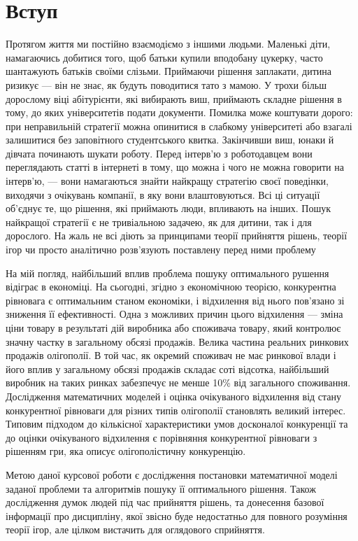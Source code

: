 \documentclass[a4paper]{article}
\begin{document}
\section{Вступ}
Протягом життя ми постійно взаємодіємо з іншими людьми. Маленькі діти, намагаючись добитися того, щоб батьки купили вподобану цукерку, часто шантажують батьків своїми слізьми. Приймаючи рішення заплакати, дитина ризикує — він не знає, як будуть поводитися тато з мамою. У трохи більш дорослому віці абітурієнти, які вибирають виш, приймають складне рішення в тому, до яких університетів подати документи. Помилка може коштувати дорого: при неправильній стратегії можна опинитися в слабкому університеті або взагалі залишитися без заповітного студентського квитка. Закінчивши виш, юнаки й дівчата починають шукати роботу. Перед інтерв'ю з роботодавцем вони переглядають статті в інтернеті в тому, що можна і чого не можна говорити на інтерв'ю, — вони намагаються знайти найкращу стратегію своєї поведінки, виходячи з очікувань компанії, в яку вони влаштовуються. Всі ці ситуації об'єднує те, що рішення, які приймають люди, впливають на інших. Пошук найкращої стратегії є не тривіальною задачею, як для дитини, так і для дорослого. На жаль не всі діють за принципами теорії прийняття рішень, теорії ігор чи просто аналітично розв'язують поставлену перед ними проблему

На мій погляд, найбільший вплив проблема пошуку оптимального рушення відіграє в економіці. На сьогодні, згідно з економічною теорією, конкурентна рівновага є оптимальним станом економіки, і відхилення від нього пов'язано зі зниження її ефективності. Одна з можливих причин цього відхилення — зміна ціни товару в результаті дій виробника або споживача товару, який контролює значну частку в загальному обсязі продажів. Велика частина реальних ринкових продажів олігополії. В той час, як окремий споживач не має ринкової влади і його вплив у загальному обсязі продажів складає соті відсотка, найбільший виробник на таких ринках забезпечує не менше 10\% від загального споживання. Дослідження математичних моделей і оцінка очікуваного відхилення від стану конкурентної рівноваги для різних типів олігополії становлять великий інтерес. Типовим підходом до кількісної характеристики умов досконалої конкуренції та до оцінки очікуваного відхилення є порівняння конкурентної рівноваги з рішенням гри, яка описує олігополістичну конкуренцію.

Метою даної курсової роботи є дослідження постановки математичної моделі заданої проблеми та алгоритмів пошуку її оптимального рішення. Також дослідження думок людей під час прийняття рішень, та донесення базової інформації про дисципліну, якої звісно буде недостатньо для повного розуміння теорії ігор, але цілком вистачить для оглядового сприйняття. 
\end{document}
